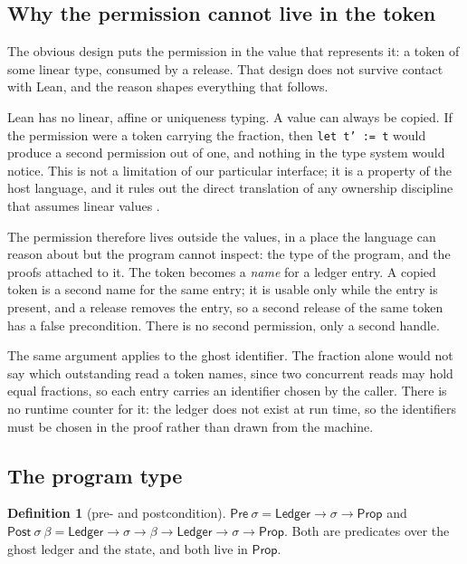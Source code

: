 \documentclass[11pt,a4paper]{article}
\theoremstyle{definition}
\newtheorem{definition}{Definition}[section]
\theoremstyle{plain}
\newcommand{\code}[1]{\texttt{#1}}
\begin{document}
\subsection{Why the permission cannot live in the token}

The obvious design puts the permission in the value that represents it: a token
of some linear type, consumed by a release. That design does not survive contact
with Lean, and the reason shapes everything that follows.

Lean has no linear, affine or uniqueness typing. A value can always be copied.
If the permission were a token carrying the fraction, then \code{let t' := t}
would produce a second permission out of one, and nothing in the type system
would notice. This is not a limitation of our particular interface; it is a
property of the host language, and it rules out the direct translation of any
ownership discipline that assumes linear values \cite{barensen1993uniqueness,
bernardy2018linear}.

The permission therefore lives outside the values, in a place the language can
reason about but the program cannot inspect: the type of the program, and the
proofs attached to it. The token becomes a \emph{name} for a ledger entry. A
copied token is a second name for the same entry; it is usable only while the
entry is present, and a release removes the entry, so a second release of the
same token has a false precondition. There is no second permission, only a
second handle.

The same argument applies to the ghost identifier. The fraction alone would not
say which outstanding read a token names, since two concurrent reads may hold
equal fractions, so each entry carries an identifier chosen by the caller. There
is no runtime counter for it: the ledger does not exist at run time, so the
identifiers must be chosen in the proof rather than drawn from the machine.

\subsection{The program type}

\begin{definition}[pre- and postcondition]\label{def:prepost}
$\mathsf{Pre}\ \sigma = \mathsf{Ledger} \to \sigma \to \mathsf{Prop}$ and
$\mathsf{Post}\ \sigma\ \beta = \mathsf{Ledger} \to \sigma \to \beta \to
\mathsf{Ledger} \to \sigma \to \mathsf{Prop}$. Both are predicates over the
ghost ledger and the state, and both live in $\mathsf{Prop}$.
\end{definition}
\end{document}
